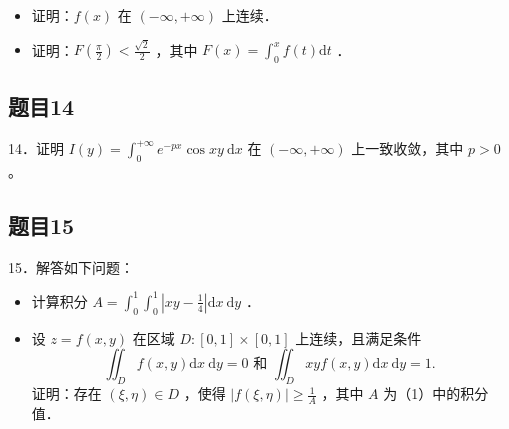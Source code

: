 \documentclass{article}
\begin{document}
\begin{itemize}
  \item[（1）] 证明：\(f(x)\) 在 \((-\infty,+\infty)\) 上连续．
  \item[（2）] 证明：\(F\left(\frac{\pi}{2}\right)<\frac{\sqrt{2}}{2}\) ，其中 \(F(x)=\int_{0}^{x} f(t) \mathrm{d} t\) ．
\end{itemize}

\subsection{题目14}
14．证明 \(I(y)=\int_{0}^{+\infty} e^{-p x} \cos x y \mathrm{~d} x\) 在 \((-\infty,+\infty)\) 上一致收敛，其中 \(p>0\) 。

\subsection{题目15}
15．解答如下问题：

\begin{itemize}
  \item[（1）] 计算积分 \(A=\int_{0}^{1} \int_{0}^{1}\left|x y-\frac{1}{4}\right| \mathrm{d} x \mathrm{~d} y\) ．
  \item[（2）] 设 \(z=f(x, y)\) 在区域 \(D:[0,1] \times[0,1]\) 上连续，且满足条件
\[
\iint_{D} f(x, y) \mathrm{d} x \mathrm{~d} y=0 \text { 和 } \iint_{D} x y f(x, y) \mathrm{d} x \mathrm{~d} y=1 \text {. }
\]
证明：存在 \((\xi, \eta) \in D\) ，使得 \(|f(\xi, \eta)| \geq \frac{1}{A}\) ，其中 \(A\) 为（1）中的积分值．
\end{itemize}
\end{document}
